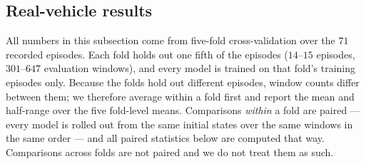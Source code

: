 %
%
%
%

\subsection{Real-vehicle results}\label{sec:donkey_results}

All numbers in this subsection come from five-fold cross-validation over the
$71$ recorded episodes. Each fold holds out one fifth of the episodes
($14$--$15$ episodes, $301$--$647$ evaluation windows), and every model is
trained on that fold's training episodes only. Because the folds hold out
different episodes, window counts differ between them; we therefore average
within a fold first and report the mean and half-range over the five fold-level
means. Comparisons \emph{within} a fold are paired --- every model is rolled out
from the same initial states over the same windows in the same order --- and all
paired statistics below are computed that way. Comparisons across folds are not
paired and we do not treat them as such.

